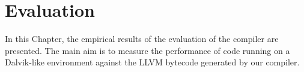 \chapter{Evaluation}
\label{chap:evaluation}

In this Chapter, the empirical results of the evaluation of the compiler are presented. The main aim is to measure the performance of code running on a Dalvik-like environment against the LLVM bytecode generated by our compiler.






